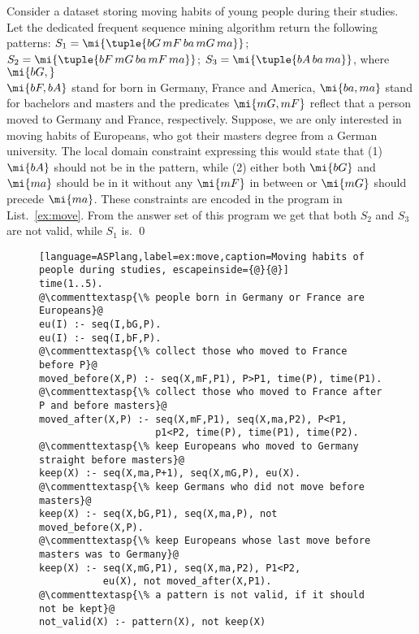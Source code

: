 \begin{example}
Consider a dataset storing moving habits of young people during their studies. Let the dedicated frequent sequence mining algorithm return the following patterns: $S_1=\mi{\tuple{bG\,mF\,ba\,mG\,ma}}$; $S_2=\mi{\tuple{bF\,mG\,ba\,mF\,ma}}$; $S_3=\mi{\tuple{bA\,ba\,ma}}$, where $\mi{bG,}$\\$\mi{bF,bA}$ stand for born in Germany, France and America, $\mi{ba,ma}$ stand for bachelors and masters and the predicates $\mi{mG,mF}$ reflect that a person moved to Germany and France, respectively. Suppose, we are only interested in moving habits of Europeans, who got their masters degree from a German university. The local domain constraint expressing this would state that (1) $\mi{bA}$ should not be in the pattern, while (2) either both $\mi{bG}$ and $\mi{ma}$ should be in it without any $\mi{mF}$ in between or $\mi{mG}$ should precede $\mi{ma}$. These constraints are encoded in the program in List.~\ref{ex:move}. From the answer set of this program we get that both  $S_2$ and $S_3$ are not valid, while $S_1$ is. \qed

 \begin{figure}[t]
 \small{
 \begin{lstlisting}[language=ASPlang,label=ex:move,caption=Moving habits of people during studies, escapeinside={@}{@}]
time(1..5).
@\commenttextasp{\% people born in Germany or France are Europeans}@
eu(I) :- seq(I,bG,P).
eu(I) :- seq(I,bF,P).
@\commenttextasp{\% collect those who moved to France before P}@
moved_before(X,P) :- seq(X,mF,P1), P>P1, time(P), time(P1).
@\commenttextasp{\% collect those who moved to France after P and before masters}@
moved_after(X,P) :- seq(X,mF,P1), seq(X,ma,P2), P<P1, 
                    p1<P2, time(P), time(P1), time(P2).
@\commenttextasp{\% keep Europeans who moved to Germany straight before masters}@
keep(X) :- seq(X,ma,P+1), seq(X,mG,P), eu(X).
@\commenttextasp{\% keep Germans who did not move before masters}@
keep(X) :- seq(X,bG,P1), seq(X,ma,P), not moved_before(X,P).
@\commenttextasp{\% keep Europeans whose last move before masters was to Germany}@
keep(X) :- seq(X,mG,P1), seq(X,ma,P2), P1<P2,  
           eu(X), not moved_after(X,P1).
@\commenttextasp{\% a pattern is not valid, if it should not be kept}@
not_valid(X) :- pattern(X), not keep(X)
 \end{lstlisting}
}
 \end{figure}
\end{example}



